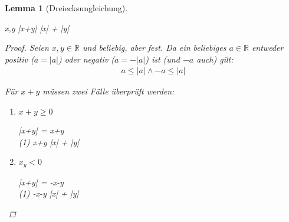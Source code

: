 \documentclass{article}
\newtheorem{lem}[thm]{Lemma}
\newenvironment{aleq}{
\begin{equation}
\begin{aligned}
}{
\end{aligned}
\end{equation}
}
\newenvironment{aleq*}{\begin{equation*}\begin{aligned}}{\end{aligned}\end{equation*}}
\begin{document}
	\begin{lem}[Dreiecksungleichung]
		\label{dreiecksungleichung}
		\begin{aleq*}
			\forall x,y \in {} \colon |x+y| \leq |x| + |y|
		\end{aleq*}
		\begin{proof}
			Seien \(x,y \in \mathbb{R}\) und beliebig, aber fest.
			Da ein beliebiges \(a \in \mathbb{R}\) entweder positiv (\(a = |a|\)) oder negativ (\(a = -|a|\)) ist (und \(-a\) auch) gilt:
			\begin{aleq}
				a \leq |a| \land -a \leq |a|
			\end{aleq}
			\par
			Für \(x+y\) müssen zwei Fälle überprüft werden:
			\begin{enumerate}[label=\theenumi . Fall: ]
				\item \(x+y \geq 0\) \\
				\begin{aleq*}
					|x+y| = x+y \\
					(1) \implies x+y \leq |x| + |y|
				\end{aleq*}
				
				\item \(x_y < 0\) \\
				\begin{aleq*}
					|x+y| = -x-y \\
					(1) \implies -x-y \leq |x| + |y|
				\end{aleq*}
			\end{enumerate}
		\end{proof}
	\end{lem}
	
\end{document}
